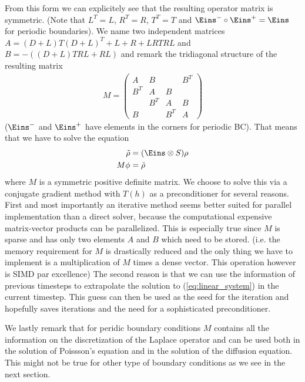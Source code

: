\documentclass[a4paper,12pt]{scrartcl}
\begin{document}
From this form we can explicitely see that the resulting operator matrix is 
symmetric. (Note that $L^T = L$, $R^T = R$, $T^T = T$ and $\Eins^-\circ \Eins^+ = \Eins$ for
periodic boundaries). 
We name two independent matrices $A = (D+L)T(D+L)^T + L + R + LR T RL$ and $B = -\left( (D+L)T RL + RL \right)$ 
and remark the tridiagonal structure of the resulting matrix
\begin{align}
   M =  \begin{pmatrix}
        A&B& &B^T \\
        B^T&A&B& \\
         &B^T&A&B\\
        B& &B^T&A
    \end{pmatrix} 
    \label{eq:operator_matrix_periodic}
\end{align}
($\Eins^-$ and $\Eins^+$ have elements in the corners for periodic BC).
That means that we have to solve the equation 
\begin{align}
    \tilde \rho &= (\Eins\otimes S )\rho \nonumber \\
    M \phi &=  \tilde \rho 
    \label{eq:linear_system}
\end{align}
where $M$ is a symmetric positive definite matrix. We choose to solve 
this via a conjugate gradient method with $T(h)$ as a preconditioner
for several reasons. 
First and most importantly  
an iterative method seems better suited for parallel implementation than a
direct solver, because the computational expensive matrix-vector products 
can be parallelized. 
This is especially true since $M$ is sparse and 
has only two elements $A$ and $B$ which need to be stored. (i.e. the memory
requirement for $M$ is drastically reduced and the only 
thing we have to implement is a multiplication of $M$ times a dense vector. 
This operation however is SIMD par excellence)
The second reason is that we can use the information of previous timesteps 
to extrapolate the solution to (\ref{eq:linear_system}) in the 
current timestep.
This guess can then be used as the seed for the iteration and hopefully 
saves iterations and the need for a sophisticated preconditioner. 

We lastly remark that for peridic boundary conditions $M$ contains all 
the information on the discretization of the Laplace operator and can be used
both in the solution of Poissson's equation and in the solution of the 
diffusion equation. This might not be true for other type of boundary conditions
as we see in the next section.
\end{document}
